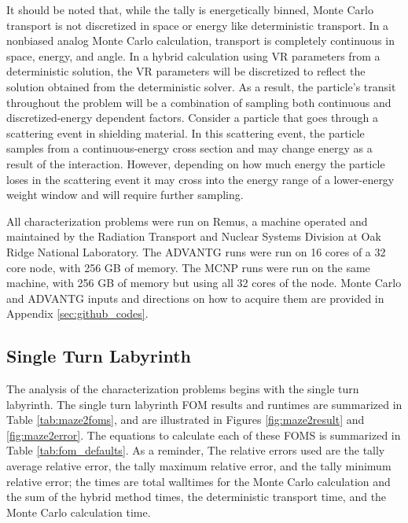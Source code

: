 It should be noted that, while the tally is energetically binned, Monte
Carlo transport is not discretized in space or energy like deterministic
transport. In a nonbiased analog Monte Carlo calculation, transport is
completely continuous in space, energy, and angle. In a hybrid calculation using
VR parameters from a deterministic solution, the VR parameters will be
discretized to reflect the solution obtained from the deterministic solver. As a
result, the particle's transit throughout the
problem will be a combination of sampling both continuous and discretized-energy
dependent factors. Consider a particle that goes through a scattering event
in shielding material. In this scattering event, the particle samples from a
continuous-energy cross section and may change energy as a result of the interaction.
However, depending on how much energy the particle loses in the scattering event it may
cross into the energy range of a lower-energy weight window and will require
further sampling.

All characterization problems were run on Remus, a machine operated and
maintained by the Radiation Transport and Nuclear Systems Division at Oak Ridge
National Laboratory. The ADVANTG runs were run on 16 cores of a 32 core node,
with 256 GB of memory. The MCNP runs were run on the same machine, with 256 GB of
memory but using all 32 cores of the node. Monte Carlo and ADVANTG
inputs and directions on how to acquire them are
provided in Appendix \ref{sec:github_codes}.



\subsection{Single Turn Labyrinth}
\label{subsec:maze2}

The analysis of the characterization problems begins with the single turn
labyrinth.
The single turn labyrinth FOM results and runtimes are summarized in Table \ref{tab:maze2foms},
and are illustrated in Figures \ref{fig:maze2result} and \ref{fig:maze2error}.
 The equations to
calculate each of these FOMS is summarized in Table \ref{tab:fom_defaults}. As a reminder,
   The relative errors used are the tally average relative error, the tally maximum relative
  error, and the tally minimum relative error; the times are total walltimes for
  the Monte Carlo calculation and the sum of the hybrid method times, the
  deterministic transport time, and the Monte Carlo calculation time.

